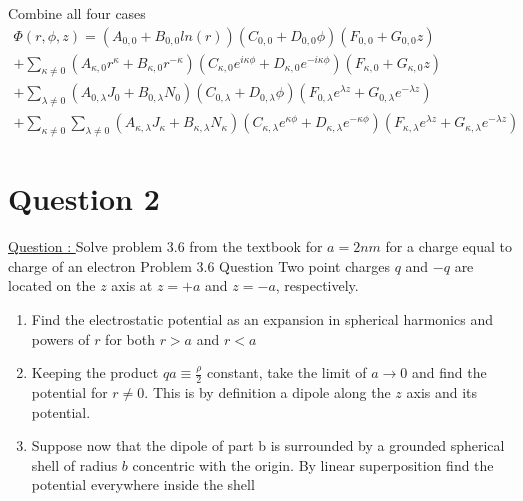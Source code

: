 \documentclass[12pt]{article}
\begin{document}
    Combine all four cases
    \begin{equation} \label{eq: 1-30}
        \begin{split}
            \Phi(r,\phi,z) = (A_{0,0} + B_{0,0} ln(r)) (C_{0,0} + D_{0,0}\phi) (F_{0,0} + G_{0,0}z)
            \\ + \sum_{\kappa \neq 0}(A_{\kappa,0} r^\kappa + B_{\kappa,0} r^{-\kappa}) (C_{\kappa,0} e^{i \kappa \phi} + D_{\kappa,0} e^{-i \kappa \phi}) (F_{\kappa,0} + G_{\kappa,0} z)
            \\  + \sum_{\lambda \neq 0} (A_{0,\lambda} J_0 + B_{0,\lambda} N_0) (C_{0,\lambda} + D_{0,\lambda} \phi)(F_{0,\lambda} e^{\lambda z} + G_{0,\lambda} e^{-\lambda z})
            \\  + \sum_{\kappa \neq 0} \sum_{\lambda \neq 0} (A_{\kappa, \lambda} J_\kappa + B_{\kappa, \lambda} N_\kappa) (C_{\kappa,\lambda} e^{\kappa \phi} + D_{\kappa,\lambda} e^{- \kappa \phi})(F_{\kappa,\lambda} e^{\lambda z} + G_{\kappa,\lambda} e^{-\lambda z})
        \end{split}
    \end{equation}

    

\newpage
\section{Question 2} \label{section2}
    \underline{Question : }
    Solve problem 3.6 from the textbook for $a=2nm$ for a charge equal to charge of an electron
    \newline Problem 3.6 Question
    \newline Two point charges $q$ and $-q$ are located on the $z$ axis at $z = +a$ and $z = -a$, respectively.
    \begin{enumerate}
        \item [a)] Find the electrostatic potential as an expansion in spherical harmonics and powers of $r$ for both $r>a$ and $r<a$
        \item [b)] Keeping the product $qa\equiv \frac{\rho}{2}$ constant, take the limit of $a \xrightarrow{} 0$ and find the potential for $r \neq 0$. This is by definition a dipole along the $z$ axis and its potential.
        \item [c)] Suppose now that the dipole of part b is surrounded by a grounded spherical shell of radius $b$ concentric with the origin. By linear superposition find the potential everywhere inside the shell
    \end{enumerate}
    
\end{document}

